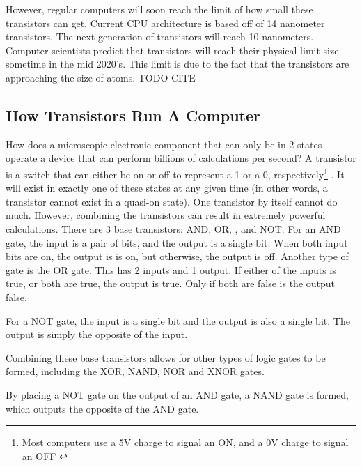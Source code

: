 \documentclass[10pt,journal,compsoc]{IEEEtran}
\begin{document}
However, regular computers will soon reach the limit of how small these transistors can get. Current CPU architecture is based off of 14 nanometer transistors. The next generation of transistors will reach 10 nanometers. 
 Computer scientists predict that transistors will reach their physical limit size sometime in the mid 2020's. This limit is due to the fact that the transistors are approaching the size of atoms. TODO CITE


\subsection{How Transistors Run A Computer}
How does a microscopic electronic component that can only be in 2 states operate a device that can perform billions of calculations per second? A transistor is a switch that can either be on or off to represent a 1 or a 0, respectively\footnote{Most computers use a 5V charge to signal an ON, and a 0V charge to signal an OFF \cite{Surrey}
	}
. It will exist in exactly one of these states at any given time (in other words, a transistor cannot exist in a quasi-on state). One transistor by itself cannot do much. However, combining the transistors can result in extremely powerful calculations. There are 3 base transistors: AND, OR, , and NOT.  For an AND gate, the input is a pair of bits, and the output is a single bit. When both input bits are on, the output is is on, but otherwise, the output is off. Another type of gate is the OR gate. This has 2 inputs and 1 output. If either of the inputs is true, or both are true, the output is true. Only if both are false is the output false. 

For a NOT gate, the input is a single bit and the output is also a single bit. The output is simply the opposite of the input. 

Combining these base transistors allows for other types of logic gates to be formed, including the XOR, NAND, NOR and XNOR gates.

 By placing a NOT gate on the output of an AND gate, a NAND gate is formed, which outputs the opposite of the AND gate. 
\end{document}
